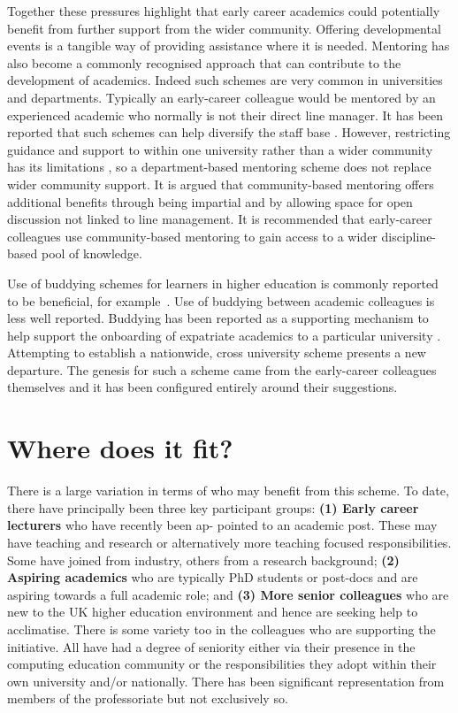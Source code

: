 \documentclass[sigconf]{acmart}
\begin{document}
Together these pressures highlight that early career academics could potentially benefit from further support from the wider community. Offering developmental events is a tangible way of providing assistance where it is needed. Mentoring has also become a commonly recognised approach that can contribute to the development of academics. Indeed such schemes are very common in universities and departments. Typically an early-career colleague would be mentored by an experienced academic who normally is not their direct line manager. It has been reported that such schemes can help diversify the staff base \cite{Golubchik2018}. However, restricting guidance and support to within one university rather than a wider community has its limitations \cite{Golubchik2018}, so a department-based mentoring scheme does not replace wider community support.  It is argued that community-based mentoring offers additional benefits through being impartial and by allowing space for open discussion not linked to line management. It is recommended that early-career colleagues use community-based mentoring to gain access to a wider discipline-based pool of knowledge. 

Use of buddying schemes for learners in higher education is commonly reported to be beneficial, for example~\cite{Hayes2020,May20}. Use of buddying between academic colleagues is less well reported. Buddying has been reported as a supporting mechanism to help support the onboarding of expatriate academics to a particular university \cite{Wilkins2019}. Attempting to establish a nationwide, cross university scheme presents a new departure. The genesis for such a scheme came from the early-career colleagues themselves and it has been configured entirely around their suggestions.
	
\section{Where does it fit?}

There is a large variation in terms of who may benefit from this scheme. To date, there have principally been three key participant groups: \textbf{(1) Early career lecturers} who have recently been ap- pointed to an academic post. These may have teaching and research or alternatively more teaching focused responsibilities. Some have joined from industry, others from a research background; \textbf{(2) Aspiring academics }who are typically PhD students or post-docs and are aspiring towards a full academic role; and \textbf{ (3) More senior colleagues} who are new to the UK higher education environment and hence are seeking help to acclimatise. There is some variety too in the colleagues who are supporting the initiative. All have had a degree of seniority either via their presence in the computing education community or the responsibilities they adopt within their own university and/or nationally. There has been significant representation from members of the professoriate but not exclusively so. 
\end{document}
